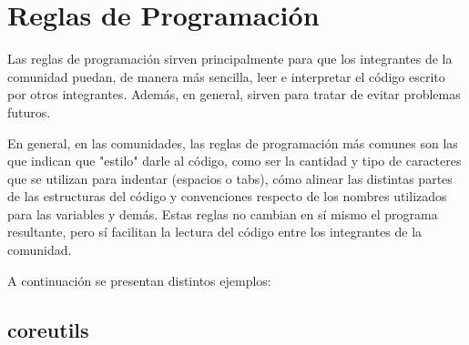 \section{Reglas de Programación}
{Las reglas de programación sirven principalmente para que los integrantes de la comunidad puedan, de manera más sencilla, leer e interpretar el código escrito por otros integrantes. Además, en general, sirven para tratar de evitar problemas futuros. 

En general, en las comunidades, las reglas de programación más comunes son las que indican que "estilo" darle al código, como ser la cantidad y tipo de caracteres que se utilizan para indentar (espacios o tabs), cómo alinear las distintas partes de las estructuras del código y convenciones respecto de los nombres utilizados para las variables y demás. Estas reglas no cambian en sí mismo el programa resultante, pero sí facilitan la lectura del código entre los integrantes de la comunidad.

A continuación se presentan distintos ejemplos:
}

\subsection{coreutils}

